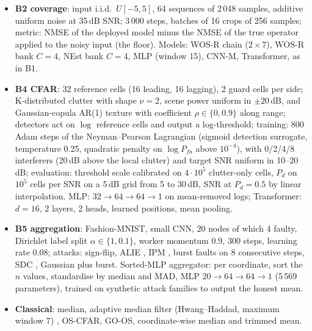 \documentclass[11pt,a4paper]{article}
\theoremstyle{definition}
\theoremstyle{remark}
\begin{document}
\begin{itemize}
\item \textbf{B2 coverage}: input i.i.d.\ $U[-5,5]$, 64 sequences of 2\,048 samples, additive uniform noise at 35\,dB
  SNR; 3\,000 steps, batches of 16 crops of 256 samples; metric: NMSE of the deployed model minus the NMSE of the true
  operator applied to the noisy input (the floor). Models: WOS-R chain ($2{\times}7$), WOS-R bank $C{=}4$, NEst bank
  $C{=}4$, MLP (window 15), CNN-M, Transformer, as in B1.
\item \textbf{B4 CFAR}: 32 reference cells (16 leading, 16 lagging), 2 guard cells per side; K-distributed clutter with
  shape $\nu=2$, scene power uniform in $\pm20$\,dB, and Gaussian-copula AR(1) texture with coefficient $\rho\in\{0,0.9\}$
  along range; detectors act on
  $\log$ reference cells and output a log-threshold; training: 800 Adam steps of the Neyman--Pearson Lagrangian
  (sigmoid detection surrogate, temperature 0.25, quadratic penalty on $\log P_{fa}$ above $10^{-4}$), with 0/2/4/8
  interferers (20\,dB above the local clutter) and target SNR uniform in 10--20\,dB; evaluation: threshold scale
  calibrated on $4\cdot10^5$ clutter-only cells, $P_d$ on $10^5$ cells per SNR on a 5\,dB grid from 5 to 30\,dB, SNR at
  $P_d=0.5$ by linear interpolation. MLP: $32{\to}64{\to}64{\to}1$ on mean-removed logs; Transformer: $d{=}16$, 2 layers, 2 heads,
  learned positions, mean pooling.
\item \textbf{B5 aggregation}: Fashion-MNIST, small CNN, 20 nodes of which 4 faulty, Dirichlet label split
  $\alpha\in\{1,0.1\}$, worker momentum 0.9, 300 steps, learning rate 0.08; attacks: sign-flip, ALIE \cite{baruch2019},
  IPM \cite{xie2019ipm}, burst faults on 8 consecutive steps, SDC \cite{dixit2021sdc}, Gaussian plus burst. Sorted-MLP
  aggregator: per coordinate, sort the $n$ values, standardise by median and MAD, MLP $20{\to}64{\to}64{\to}1$
  (5\,569 parameters), trained on synthetic attack families to output the honest mean.
\item \textbf{Classical}: median, adaptive median filter (Hwang--Haddad, maximum window 7) \cite{hwang1995}, OS-CFAR, GO-OS,
  coordinate-wise median and trimmed mean.
\end{itemize}
\end{document}
